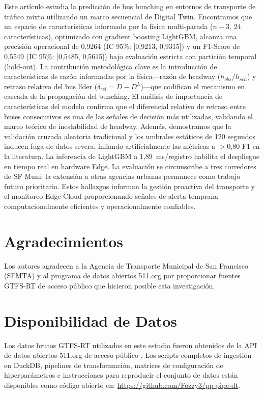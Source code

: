 \documentclass[fleqn,10pt,lineno]{wlpeerj}
\begin{document}
Este art\'iculo estudia la predicci\'on de bus bunching en entornos de transporte de tr\'afico mixto utilizando un marco secuencial de Digital Twin. Encontramos que un espacio de caracter\'isticas informado por la f\'isica multi-parada ($n{-}3$, 24 caracter\'isticas), optimizado con gradient boosting LightGBM, alcanza una precisi\'on operacional de 0,9264 (IC 95\%: [0,9213, 0,9315]) y un F1-Score de 0,5549 (IC 95\%: [0,5485, 0,5615]) bajo evaluaci\'on estricta con partici\'on temporal (hold-out). La contribuci\'on metodol\'ogica clave es la introducci\'on de caracter\'isticas de raz\'on informadas por la f\'isica---raz\'on de headway ($h_{obs}/h_{sch}$) y retraso relativo del bus l\'ider ($\delta_{rel} = D - D^{L}$)---que codifican el mecanismo en cascada de la propagaci\'on del bunching. El an\'alisis de importancia de caracter\'isticas del modelo confirma que el diferencial relativo de retraso entre buses consecutivos es una de las se\~nales de decisi\'on m\'as utilizadas, validando el marco te\'orico de inestabilidad de headway. Adem\'as, demostramos que la validaci\'on cruzada aleatoria tradicional y los umbrales est\'aticos de 120 segundos inducen fuga de datos severa, inflando artificialmente las m\'etricas a $>$0,80 F1 en la literatura. La inferencia de LightGBM a 1,89~ms/registro habilita el despliegue en tiempo real en hardware Edge. La evaluaci\'on se circunscribe a tres corredores de SF Muni; la extensi\'on a otras agencias urbanas permanece como trabajo futuro prioritario. Estos hallazgos informan la gesti\'on proactiva del transporte y el monitoreo Edge-Cloud proporcionando se\~nales de alerta temprana computacionalmente eficientes y operacionalmente confiables.

\section*{Agradecimientos}

Los autores agradecen a la Agencia de Transporte Municipal de San Francisco (SFMTA) y al programa de datos abiertos 511.org por proporcionar fuentes GTFS-RT de acceso p\'ublico que hicieron posible esta investigaci\'on.

\section*{Disponibilidad de Datos}

Los datos brutos GTFS-RT utilizados en este estudio fueron obtenidos de la API de datos abiertos 511.org de acceso p\'ublico \citep{28}. Los scripts completos de ingesti\'on en DuckDB, pipelines de transformaci\'on, matrices de configuraci\'on de hiperpar\'ametros e instrucciones para reproducir el conjunto de datos est\'an disponibles como c\'odigo abierto en:
\url{https://github.com/Fozzy3/pp-pipe-dt}.
\end{document}
